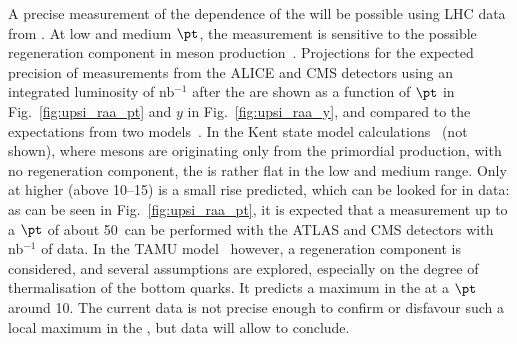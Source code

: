 \documentclass[../report.tex]{subfiles}
\begin{document}
A precise measurement of the \pt dependence of the  \raa will be possible using LHC data from \RunsThreeFour. At low and medium $\pt$, the measurement is
sensitive to the possible regeneration component in \PGU meson production~\cite{Du:2017qkv}. Projections for the expected precision of \PGU measurements from the ALICE and CMS detectors
using an integrated luminosity of \unit[10]{nb}$^{-1}$ after the \RunsThreeFour are shown as a function of $\pt$ in Fig.~\ref{fig:upsi_raa_pt} and $y$ in Fig.~\ref{fig:upsi_raa_y}, and compared to the expectations from two 
models~\cite{Krouppa:2017jlg,Du:2017qkv}. In the Kent state model calculations~\cite{Krouppa:2017jlg} (not shown), where \PgU mesons are originating only from the primordial
production, with no regeneration component, the \raa is rather flat in the low and medium \pt range.
Only at higher \pt (above 10--15\UGeVc) is a small rise predicted, which can be looked for in \RunsThreeFour data: as can be seen in Fig.~\ref{fig:upsi_raa_pt}, it is expected that a measurement up to a $\pt$ of about 50\UGeVc\ can be performed with the ATLAS and CMS detectors with
\unit[10]{nb}$^{-1}$ of data. 
In the TAMU model~\cite{Du:2017qkv} however, a regeneration
component is considered, and several assumptions are explored, especially on the degree of thermalisation of the bottom quarks. 
It predicts a maximum in the  \raa at a $\pt$ around 10\UGeVc. The current data is not precise enough to confirm or disfavour such a local maximum in the \raa, but \RunsThreeFour
data will allow to conclude.
\end{document}
